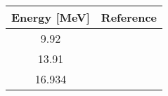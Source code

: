 \begin{tabular}{|c||c|} 
    \hline 
    \bf{Energy [MeV]} & \bf{Reference} \\
    \hline
    \hline 
    9.92 & \cite{Guss85}\\
    13.91 & \cite{Guss85}\\
    16.934 & \cite{Pedroni88}\\
    \hline
\end{tabular}
